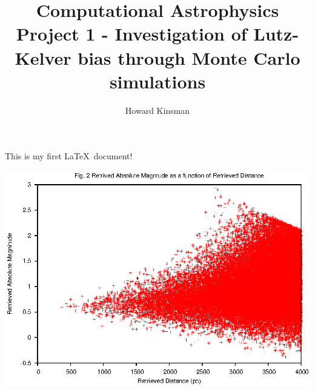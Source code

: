 \documentclass[a4paper,12pt]{article}
\author{Howard Kinsman}
\title{Computational Astrophysics Project 1 - Investigation of Lutz-Kelver bias through Monte Carlo simulations}
\begin{document}
\maketitle

This is my first \LaTeX\ document!

\centering
\includegraphics{./Graph1}
\end{document}
